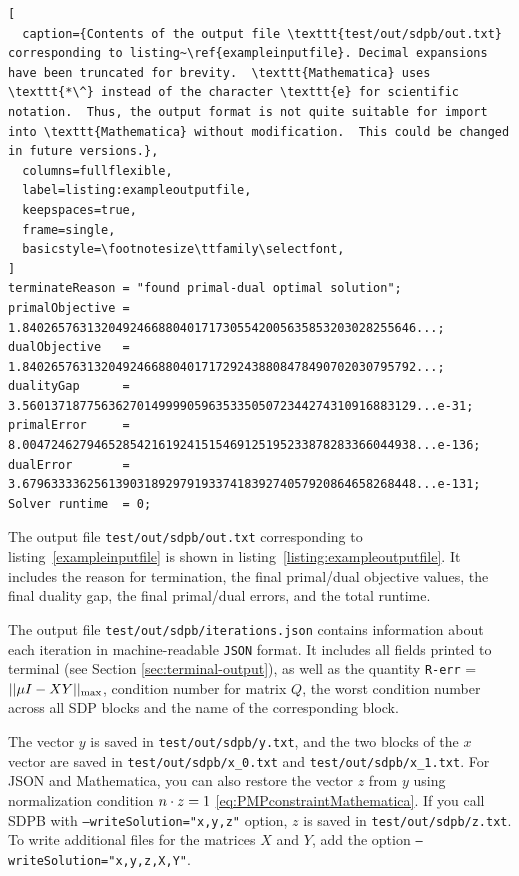 \documentclass[12pt]{article}
\numberwithin{equation}{section}
\begin{document}
\begin{lstlisting}[
  caption={Contents of the output file \texttt{test/out/sdpb/out.txt} corresponding to listing~\ref{exampleinputfile}. Decimal expansions have been truncated for brevity.  \texttt{Mathematica} uses \texttt{*\^} instead of the character \texttt{e} for scientific notation.  Thus, the output format is not quite suitable for import into \texttt{Mathematica} without modification.  This could be changed in future versions.},
  columns=fullflexible,
  label=listing:exampleoutputfile,
  keepspaces=true,
  frame=single,
  basicstyle=\footnotesize\ttfamily\selectfont,
]
terminateReason = "found primal-dual optimal solution";
primalObjective = 1.8402657631320492466880401717305542005635853203028255646...;
dualObjective   = 1.8402657631320492466880401717292438808478490702030795792...;
dualityGap      = 3.5601371877563627014999905963533505072344274310916883129...e-31;
primalError     = 8.0047246279465285421619241515469125195233878283366044938...e-136;
dualError       = 3.6796333362561390318929791933741839274057920864658268448...e-131;
Solver runtime  = 0;
\end{lstlisting}


The output file \texttt{test/out/sdpb/out.txt} corresponding to
listing~\ref{exampleinputfile} is shown in
listing~\ref{listing:exampleoutputfile}. It includes the reason for
termination, the final primal/dual objective values, the final duality
gap, the final primal/dual errors, and the total runtime.

The output file \texttt{test/out/sdpb/iterations.json} contains information about each iteration in machine-readable \texttt{JSON} format. It includes all fields printed to terminal (see Section \ref{sec:terminal-output}),
as well as the quantity \texttt{R-err} = $||\mu I - XY ||_{\rm max}$, condition number for matrix $Q$, the worst condition number across all SDP blocks and the name of the corresponding block.

The vector
$y$ is saved in \texttt{test/out/sdpb/y.txt}, and the two blocks of the $x$ vector
are saved in \texttt{test/out/sdpb/x\_0.txt} and
\texttt{test/out/sdpb/x\_1.txt}.
For JSON and Mathematica, you can also restore the vector $z$ from $y$
using normalization condition $n\.z=1$ \eqref{eq:PMPconstraintMathematica}.
If you call SDPB with \texttt{--writeSolution="x,y,z"} option, $z$ is saved in \texttt{test/out/sdpb/z.txt}.
To write additional files for the matrices $X$ and $Y$, add the
option %
\texttt{--writeSolution="x,y,z,X,Y"}.
\end{document}
